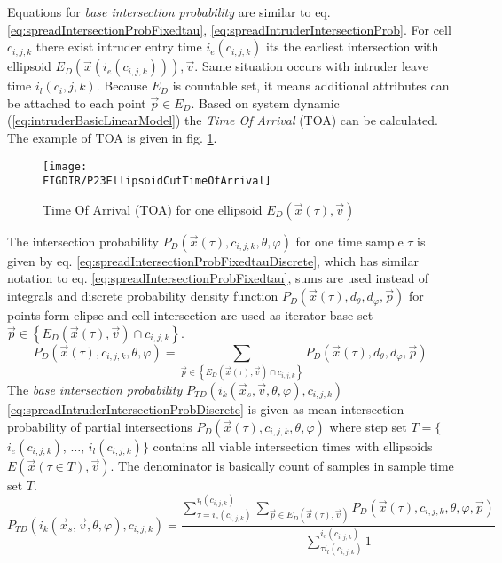 \noindent Equations for \emph{base intersection probability} are similar to eq. \ref{eq:spreadIntersectionProbFixedtau}, \ref{eq:spreadIntruderIntersectionProb}. For cell $c_{i,j,k}$ there exist intruder entry time $i_e(c_{i,j,k})$ its the earliest intersection with ellipsoid $E_D(\vec{x}(i_e(c_{i,j,k}))),\vec{v}$. Same situation occurs with intruder leave time $i_l(c_i,j,k)$. Because $E_D$ is countable set, it means additional attributes can be attached to each point $\vec{p}\in E_D$. Based on system dynamic (\ref{eq:intruderBasicLinearModel}) the \emph{Time Of Arrival} (TOA) can be calculated. The example of TOA is given in fig. \ref{fig:P23EllipsoidCutTimeOfArrival}.
\begin{figure}[H]
    \centering
    \texttt{[image: \\FIGDIR/P23EllipsoidCutTimeOfArrival]}
    \caption{Time Of Arrival (TOA) for one ellipsoid $E_D(\vec{x}(\tau),\vec{v})$}
    \label{fig:P23EllipsoidCutTimeOfArrival}
\end{figure}
\noindent The intersection probability $P_D(\vec{x}(\tau),c_{i,j,k},\theta,\varphi)$ for one time sample $\tau$ is given by eq. \ref{eq:spreadIntersectionProbFixedtauDiscrete}, which has similar notation to eq. \ref{eq:spreadIntersectionProbFixedtau}, sums are used instead of integrals and discrete probability density function $P_D(\vec{x}(\tau),d_\theta,d_\varphi,\vec{p})$ for points form elipse and cell intersection are used as iterator base set $\vec{p}\in\left\{E_D(\vec{x}(\tau),\vec{v})\cap c_{i,j,k}\right\}$.
\begin{equation}\label{eq:spreadIntersectionProbFixedtauDiscrete}
    P_D(\vec{x}(\tau),c_{i,j,k},\theta,\varphi) =\sum_{\vec{p}\in \left\{E_D(\vec{x}(\tau),\vec{v})\cap c_{i,j,k}\right\}} P_D(\vec{x}(\tau),d_\theta,d_\varphi,\vec{p})
\end{equation}
\noindent The \emph{base intersection probability} $P_{TD}(i_k(\vec{x}_s,\vec{v},\theta,\varphi),c_{i,j,k})$ \ref{eq:spreadIntruderIntersectionProbDiscrete} is given as mean intersection probability of partial intersections $P_D(\vec{x}(\tau),c_{i,j,k},\theta,\varphi)$ where step set $T=\{$ $i_e(c_{i,j,k})$, $\dots$, $i_l(c_{i,j,k})\}$ contains all viable intersection times with ellipsoids $E(\vec{x}(\tau\in T),\vec{v})$. The denominator is basically count of samples in sample time set $T$. 
\begin{equation}\label{eq:spreadIntruderIntersectionProbDiscrete} 
    P_{TD}(i_k(\vec{x}_s,\vec{v},\theta,\varphi),c_{i,j,k})=\frac{\sum_{\tau=i_e(c_{i,j,k})}^{i_l(c_{i,j,k})} \sum_{\vec{p}\in E_D(\vec{x}(\tau),\vec{v})}P_D(\vec{x}(\tau),c_{i,j,k},\theta,\varphi,\vec{p})}{\sum_{\tau i_l(c_{i,j,k})}^{i_e(c_{i,j,k})} 1}
\end{equation}
